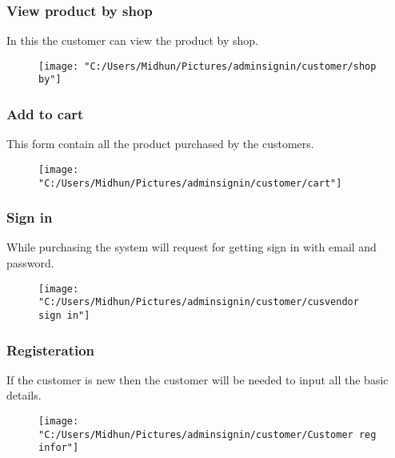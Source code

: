 \documentclass{beamer}
\begin{document}
\begin{frame}
\subsubsection{View product by shop}
In this the customer can view the product by shop.
\begin{figure}[bph]
	\centering
	\texttt{[image: "C:/Users/Midhun/Pictures/adminsignin/customer/shop by"]}
	\label{fig:admin-signin}
\end{figure}

\end{frame}

\begin{frame}
\subsubsection{Add to cart }
This form contain all the product purchased by the customers.
\begin{figure}[bph]
	\centering
	\texttt{[image: "C:/Users/Midhun/Pictures/adminsignin/customer/cart"]}
	\label{fig:admin-signin}
\end{figure}

\end{frame}

\begin{frame}
\subsubsection{Sign in}
While purchasing the system will request for getting sign in with email and password.
\begin{figure}[bph]
	\centering
	\texttt{[image: "C:/Users/Midhun/Pictures/adminsignin/customer/cusvendor sign in"]}
	\label{fig:admin-signin}
\end{figure}


\end{frame}

\begin{frame}
\subsubsection{Registeration}
If the customer is new then the customer will be needed to input all the basic details.
\begin{figure}[bph]
	\centering
	\texttt{[image: "C:/Users/Midhun/Pictures/adminsignin/customer/Customer reg infor"]}
	\label{fig:admin-signin}
\end{figure}


\end{frame}
\end{document}
